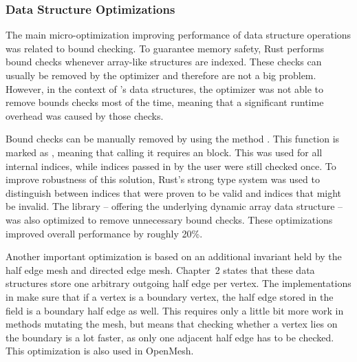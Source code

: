 \vspace{-1mm}
\subsubsection*{Data Structure Optimizations}

The main micro-optimization improving performance of data structure operations was related to bound checking.
To guarantee memory safety, Rust performs bound checks whenever array-like structures are indexed.
These checks can usually be removed by the optimizer and therefore are not a big problem.
However, in the context of 's data structures, the optimizer was not able to remove bounds checks most of the time, meaning that a significant runtime overhead was caused by those checks.

Bound checks can be manually removed by using the method .
This function is marked as , meaning that calling it requires an  block.
This was used for all internal indices, while indices passed in by the user were still checked once.
To improve robustness of this solution, Rust's strong type system was used to distinguish between indices that were proven to be valid and indices that might be invalid.
The library  -- offering the underlying dynamic array data structure -- was also optimized to remove unnecessary bound checks.
These optimizations improved overall performance by roughly 20\%.

Another important optimization is based on an additional invariant held by the half edge mesh and directed edge mesh.
Chapter~2 states that these data structures store one arbitrary outgoing half edge per vertex.
The implementations in  make sure that if a vertex is a boundary vertex, the half edge stored in the  field is a boundary half edge as well.
This requires only a little bit more work in methods mutating the mesh, but means that checking whether a vertex lies on the boundary is a lot faster, as only one adjacent half edge has to be checked.
This optimization is also used in OpenMesh.
